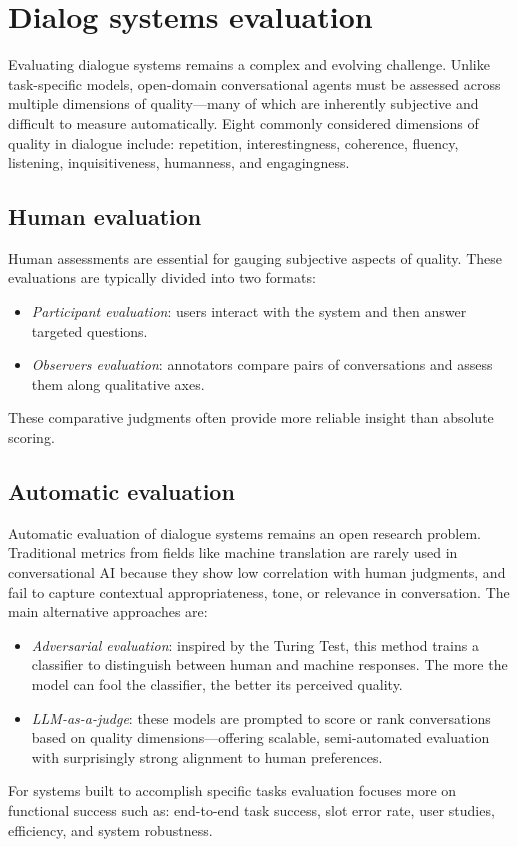 \section{Dialog systems evaluation}

Evaluating dialogue systems remains a complex and evolving challenge. 
Unlike task-specific models, open-domain conversational agents must be assessed across multiple dimensions of quality—many of which are inherently subjective and difficult to measure automatically.
Eight commonly considered dimensions of quality in dialogue include: repetition, interestingness, coherence, fluency, listening, inquisitiveness, humanness, and engagingness. 

\subsection{Human evaluation}
Human assessments are essential for gauging subjective aspects of quality. 
These evaluations are typically divided into two formats:
\begin{itemize}
    \item \textit{Participant evaluation}: users interact with the system and then answer targeted questions.
    \item \textit{Observers evaluation}: annotators compare pairs of conversations and assess them along qualitative axes. 
\end{itemize}
\noindent These comparative judgments often provide more reliable insight than absolute scoring.

\subsection{Automatic evaluation}
Automatic evaluation of dialogue systems remains an open research problem.
Traditional metrics from fields like machine translation are rarely used in conversational AI because they show low correlation with human judgments, and fail to capture contextual appropriateness, tone, or relevance in conversation.
The main alternative approaches are: 
\begin{itemize}
    \item \textit{Adversarial evaluation}: inspired by the Turing Test, this method trains a classifier to distinguish between human and machine responses.
         The more the model can fool the classifier, the better its perceived quality.
    \item \textit{LLM-as-a-judge}: these models are prompted to score or rank conversations based on quality dimensions—offering scalable, semi-automated evaluation with surprisingly strong alignment to human preferences.
\end{itemize}
\noindent For systems built to accomplish specific tasks evaluation focuses more on functional success such as: end-to-end task success, slot error rate, user studies, efficiency, and system robustness.